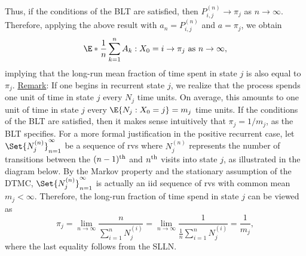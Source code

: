 \begin{Regular}
    Thus, if the conditions of the BLT are satisfied, then $ P_{i,j}^{(n)}\to \pi_j $ as $ n\to\infty $. Therefore,
    applying the above result with $ a_n=P_{i,j}^{(n)} $ and $ a=\pi_j $, we obtain
    \[ \E*{\frac{1}{n} \sum_{k=1}^{n} A_{k} \given X_{0}=i}\to \pi_j\text{ as }n\to\infty, \]
    implying that the long-run mean fraction of time spent in state $j$ is also equal to $ \pi_j $.
    \tcblower{}
    \underline{Remark}: If one begins in recurrent state $ j $, we realize that the process spends one unit of time in
    state $ j $ every $ N_j $ time units. On average, this amounts to one unit of time in state $ j $ every
    $ \E{N_j\given X_0=j}=m_j $ time units. If the
    conditions of the BLT are satisfied, then it makes sense intuitively that $ \pi_j=1/m_j $, as the BLT specifies.
    For a more formal justification in the positive recurrent case, let $ \Set{N_j^{(n)}}_{n=1}^\infty $ be a sequence of rvs where $ N_j^{(n)} $ represents
    the number of transitions between the $ (n-1)\textsuperscript{th} $ and $ n\textsuperscript{th} $ visits into state $ j $, as illustrated in the diagram below.
    By the Markov property and the stationary assumption of the DTMC, $ \Set{N_j^{(n)}}_{n=1}^\infty $ is actually an iid sequence of rvs
    with common mean $ m_j<\infty $. Therefore, the long-run fraction of time spend in state $ j $ can be viewed as
    \[ \pi_j=\lim\limits_{{n} \to {\infty}} \frac{n}{\sum_{i=1}^{n} N_j^{(i)}} =\lim\limits_{{n} \to {\infty}} \frac{1}{\frac{1}{n} \sum_{i=1}^{n} N_j^{(i)}}=\frac{1}{m_j},   \]
    where the last equality follows from the SLLN\@.
    \begin{center}
\end{center}
\end{Regular}

